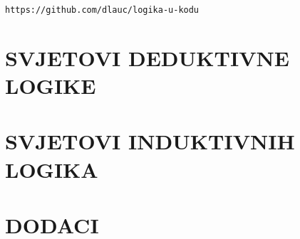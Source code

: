 \documentclass[11pt,a4paper,twoside,openright]{book}
\theoremstyle{definition}
\theoremstyle{plain}
\theoremstyle{remark}
\begin{document}
\texttt{https://github.com/dlauc/logika-u-kodu}
\vspace*{\fill}

\tableofcontents



\mainmatter


\part{SVJETOVI DEDUKTIVNE LOGIKE}






\part{SVJETOVI INDUKTIVNIH LOGIKA}




\part{DODACI}

\appendix
 



\backmatter
% 
% 
\end{document}
